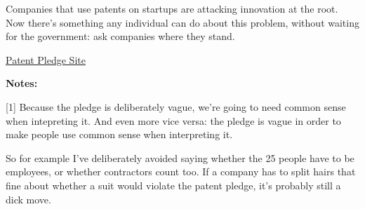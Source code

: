 Companies
                  that use patents on startups are attacking innovation at the
                  root. Now there's something any individual can do about this
                  problem, without waiting for the government: ask companies
                  where they stand.




                  \href{http://thepatentpledge.org}{Patent Pledge Site}




                  \textbf{Notes:}

[1] Because the pledge is deliberately vague, we're going to
                  need common sense when intepreting it. And even more vice
                  versa: the pledge is vague in order to make people use common
                  sense when interpreting it.

So for example I've
                  deliberately avoided saying whether the 25 people have to be
                  employees, or whether contractors count too. If a company has
                  to split hairs that fine about whether a suit would violate
                  the patent pledge, it's probably still a dick move.


              
            
          
